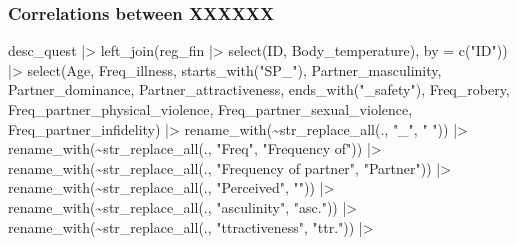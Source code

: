 \documentclass[
  bookmarksnumbered]{article}
\newenvironment{Shaded}{\begin{snugshade}}{\end{snugshade}}
\newcommand{\AttributeTok}[1]{\textcolor[rgb]{0.80,0.80,0.80}{#1}}
\newcommand{\FunctionTok}[1]{\textcolor[rgb]{0.94,0.94,0.56}{#1}}
\newcommand{\NormalTok}[1]{\textcolor[rgb]{0.80,0.80,0.80}{#1}}
\newcommand{\SpecialCharTok}[1]{\textcolor[rgb]{0.86,0.64,0.64}{#1}}
\newcommand{\StringTok}[1]{\textcolor[rgb]{0.80,0.58,0.58}{#1}}
\begin{document}
\subsubsection{Correlations between XXXXXX}\label{correlations-between-xxxxxx}

\begin{Shaded}
\begin{Highlighting}[]
\NormalTok{desc\_quest }\SpecialCharTok{|\textgreater{}} 
  \FunctionTok{left\_join}\NormalTok{(reg\_fin }\SpecialCharTok{|\textgreater{}} 
              \FunctionTok{select}\NormalTok{(ID, Body\_temperature), }
            \AttributeTok{by =} \FunctionTok{c}\NormalTok{(}\StringTok{"ID"}\NormalTok{)) }\SpecialCharTok{|\textgreater{}}
  \FunctionTok{select}\NormalTok{(Age,}
\NormalTok{         Freq\_illness,}
         \FunctionTok{starts\_with}\NormalTok{(}\StringTok{"SP\_"}\NormalTok{),}
\NormalTok{         Partner\_masculinity, Partner\_dominance, Partner\_attractiveness,}
         \FunctionTok{ends\_with}\NormalTok{(}\StringTok{"\_safety"}\NormalTok{), Freq\_robery,}
\NormalTok{         Freq\_partner\_physical\_violence, }
\NormalTok{         Freq\_partner\_sexual\_violence, }
\NormalTok{         Freq\_partner\_infidelity) }\SpecialCharTok{|\textgreater{}} 
  \FunctionTok{rename\_with}\NormalTok{(}\SpecialCharTok{\textasciitilde{}}\FunctionTok{str\_replace\_all}\NormalTok{(., }\StringTok{"\_"}\NormalTok{, }\StringTok{" "}\NormalTok{)) }\SpecialCharTok{|\textgreater{}} 
  \FunctionTok{rename\_with}\NormalTok{(}\SpecialCharTok{\textasciitilde{}}\FunctionTok{str\_replace\_all}\NormalTok{(., }\StringTok{"Freq"}\NormalTok{, }\StringTok{"Frequency of"}\NormalTok{)) }\SpecialCharTok{|\textgreater{}}
  \FunctionTok{rename\_with}\NormalTok{(}\SpecialCharTok{\textasciitilde{}}\FunctionTok{str\_replace\_all}\NormalTok{(., }\StringTok{"Frequency of partner"}\NormalTok{, }\StringTok{"Partner"}\NormalTok{)) }\SpecialCharTok{|\textgreater{}}
  \FunctionTok{rename\_with}\NormalTok{(}\SpecialCharTok{\textasciitilde{}}\FunctionTok{str\_replace\_all}\NormalTok{(., }\StringTok{"Perceived"}\NormalTok{, }\StringTok{""}\NormalTok{)) }\SpecialCharTok{|\textgreater{}}
  \FunctionTok{rename\_with}\NormalTok{(}\SpecialCharTok{\textasciitilde{}}\FunctionTok{str\_replace\_all}\NormalTok{(., }\StringTok{"asculinity"}\NormalTok{, }\StringTok{"asc."}\NormalTok{)) }\SpecialCharTok{|\textgreater{}}
  \FunctionTok{rename\_with}\NormalTok{(}\SpecialCharTok{\textasciitilde{}}\FunctionTok{str\_replace\_all}\NormalTok{(., }\StringTok{"ttractiveness"}\NormalTok{, }\StringTok{"ttr."}\NormalTok{)) }\SpecialCharTok{|\textgreater{}}

\end{Highlighting}
\end{Shaded}
\end{document}
